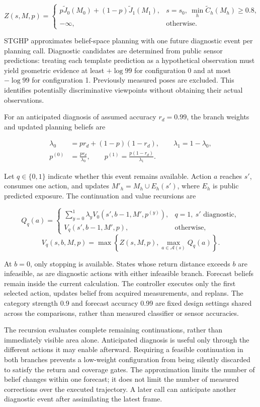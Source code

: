 \documentclass[pdflatex,sn-mathphys-num]{sn-jnl}
\begin{document}
\[
Z(s,M,p)=
\begin{cases}
p\widetilde J_0(M_0)+(1-p)\widetilde J_1(M_1),
&s=s_0,\ \min_h\widetilde C_h(M_h)\ge0.8,\\
-\infty,&\text{otherwise}.
\end{cases}
\]

STGHP approximates belief-space planning \cite{ref12,ref13} with one future diagnostic event per planning call. Diagnostic candidates are determined from public sensor predictions: treating each template prediction as a hypothetical observation must yield geometric evidence at least \(+\log99\) for configuration 0 and at most \(-\log99\) for configuration 1. Previously measured poses are excluded. This identifies potentially discriminative viewpoints without obtaining their actual observations.

For an anticipated diagnosis of assumed accuracy \(r_d=0.99\), the branch weights and updated planning beliefs are

\[
\begin{aligned}
\lambda_0&=pr_d+(1-p)(1-r_d),\qquad \lambda_1=1-\lambda_0,\\
p^{(0)}&=\frac{pr_d}{\lambda_0},\qquad
p^{(1)}=\frac{p(1-r_d)}{\lambda_1}.
\end{aligned}
\]

Let \(q\in\{0,1\}\) indicate whether this event remains available. Action \(a\) reaches \(s'\), consumes one action, and updates \(M'_h=M_h\cup E_h(s')\), where \(E_h\) is public predicted exposure. The continuation and value recursions are

\[
Q_q(a)=
\begin{cases}
\sum_{y=0}^{1}\lambda_y V_0(s',b-1,M',p^{(y)}),
&q=1,\ s'\text{ diagnostic},\\
V_q(s',b-1,M',p),&\text{otherwise},
\end{cases}
\] \[
V_q(s,b,M,p)=\max\left\{Z(s,M,p),\max_{a\in\mathcal A(s)}Q_q(a)\right\}.
\]

At \(b=0\), only stopping is available. States whose return distance exceeds \(b\) are infeasible, as are diagnostic actions with either infeasible branch. Forecast beliefs remain inside the current calculation. The controller executes only the first selected action, updates belief from acquired measurements, and replans. The category strength 0.9 and forecast accuracy 0.99 are fixed design settings shared across the comparisons, rather than measured classifier or sensor accuracies.

The recursion evaluates complete remaining continuations, rather than immediately visible area alone. Anticipated diagnosis is useful only through the different actions it may enable afterward. Requiring a feasible continuation in both branches prevents a low-weight configuration from being silently discarded to satisfy the return and coverage gates. The approximation limits the number of belief changes within one forecast; it does not limit the number of measured corrections over the executed trajectory. A later call can anticipate another diagnostic event after assimilating the latest frame.
\end{document}
